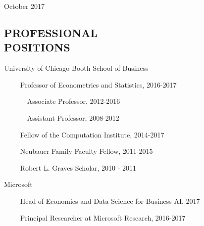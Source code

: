 \documentclass[margin,line]{res}
\begin{document}
\hfill {\sc October 2017}

\begin{resume}

\medskip



\medskip
\section{\bf PROFESSIONAL\\ POSITIONS}

University of Chicago Booth School of Business

\vspace{-.4cm}~~~~ Professor of Econometrics and Statistics, 2016-2017 

\vspace{-.4cm}~~~~~~ Associate Professor, 2012-2016


\vspace{-.4cm} ~~~~~~ Assistant Professor,  2008-2012


\vspace{-.4cm}~~~~ Fellow of the Computation Institute,  2014-2017 


\vspace{-.4cm}~~~~ Neubauer Family Faculty Fellow, 2011-2015

\vspace{-.4cm} ~~~~ Robert L. Graves Scholar,  2010 - 2011

\vspace{-.2cm}
Microsoft

\vspace{-.4cm}~~~~ Head of Economics and Data Science for Business AI, 2017

\vspace{-.4cm}~~~~ Principal Researcher at Microsoft Research, 2016-2017



\end{resume}
\end{document}

